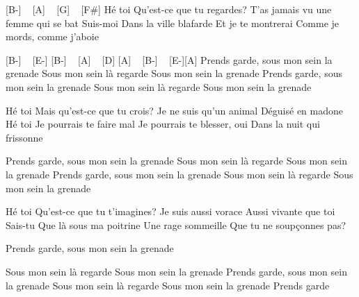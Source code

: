 [B-] ~ [A] ~ [G] ~ [F#]
Hé toi
Qu'est-ce que tu regardes?
T'as jamais vu une femme qui se bat
Suis-moi
Dans la ville blafarde
Et je te montrerai
Comme je mords, comme j'aboie

[B-] ~ [E-] [B-] ~ [A] ~ [D] [A] ~ [B-] ~ [E-][A]
Prends garde, sous mon sein la grenade
Sous mon sein là regarde
Sous mon sein la grenade
Prends garde, sous mon sein la grenade
Sous mon sein là regarde
Sous mon sein la grenade

Hé toi
Mais qu'est-ce que tu crois?
Je ne suis qu'un animal
Déguisé en madone
Hé toi
Je pourrais te faire mal
Je pourrais te blesser, oui
Dans la nuit qui frissonne


Prends garde, sous mon sein la grenade
Sous mon sein là regarde
Sous mon sein la grenade
Prends garde, sous mon sein la grenade
Sous mon sein là regarde
Sous mon sein la grenade

Hé toi
Qu'est-ce que tu t'imagines?
Je suis aussi vorace
Aussi vivante que toi
Sais-tu
Que là sous ma poitrine
Une rage sommeille
Que tu ne soupçonnes pas?

Prends garde, sous mon sein la grenade

Sous mon sein là regarde
Sous mon sein la grenade
Prends garde, sous mon sein la grenade
Sous mon sein là regarde
Sous mon sein la grenade
Prends garde

